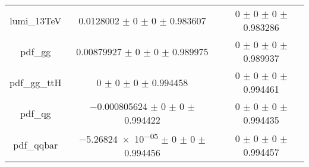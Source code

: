\begin{table}
\begin{tabular}{ccc}
lumi\_13TeV & \num{0.0128002} $\pm$ \num{0} $\pm$ \num{0} $\pm$ \num{0.983607} & \num{0} $\pm$ \num{0} $\pm$ \num{0} $\pm$ \num{0.983286}\\
pdf\_gg & \num{0.00879927} $\pm$ \num{0} $\pm$ \num{0} $\pm$ \num{0.989975} & \num{0} $\pm$ \num{0} $\pm$ \num{0} $\pm$ \num{0.989937}\\
pdf\_gg\_ttH & \num{0} $\pm$ \num{0} $\pm$ \num{0} $\pm$ \num{0.994458} & \num{0} $\pm$ \num{0} $\pm$ \num{0} $\pm$ \num{0.994461}\\
pdf\_qg & \num{-0.000805624} $\pm$ \num{0} $\pm$ \num{0} $\pm$ \num{0.994422} & \num{0} $\pm$ \num{0} $\pm$ \num{0} $\pm$ \num{0.994435}\\
pdf\_qqbar & \num{-5.26824e-05} $\pm$ \num{0} $\pm$ \num{0} $\pm$ \num{0.994456} & \num{0} $\pm$ \num{0} $\pm$ \num{0} $\pm$ \num{0.994457}\\
\bottomrule
\end{tabular}
\end{table}